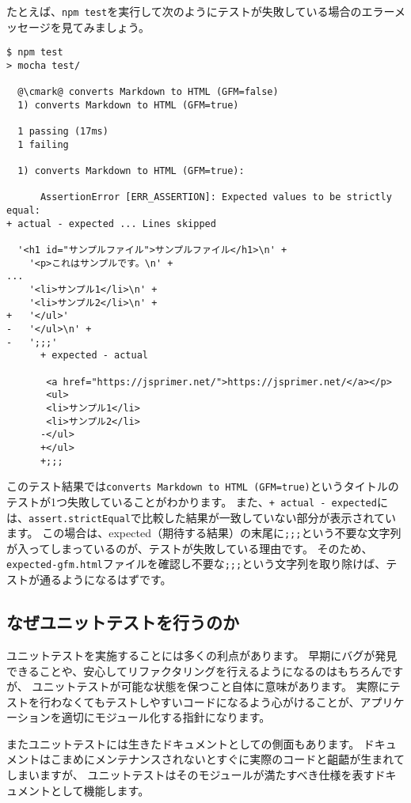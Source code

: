 たとえば、\texttt{npm test}を実行して次のようにテストが失敗している場合のエラーメッセージを見てみましょう。

\begin{lstlisting}[escapechar=@]
$ npm test
> mocha test/

  @\cmark@ converts Markdown to HTML (GFM=false)
  1) converts Markdown to HTML (GFM=true)

  1 passing (17ms)
  1 failing

  1) converts Markdown to HTML (GFM=true):

      AssertionError [ERR_ASSERTION]: Expected values to be strictly equal:
+ actual - expected ... Lines skipped

  '<h1 id="サンプルファイル">サンプルファイル</h1>\n' +
    '<p>これはサンプルです。\n' +
...
    '<li>サンプル1</li>\n' +
    '<li>サンプル2</li>\n' +
+   '</ul>'
-   '</ul>\n' +
-   ';;;'
      + expected - actual

       <a href="https://jsprimer.net/">https://jsprimer.net/</a></p>
       <ul>
       <li>サンプル1</li>
       <li>サンプル2</li>
      -</ul>
      +</ul>
      +;;;
\end{lstlisting}

このテスト結果では\texttt{converts Markdown to HTML (GFM=true)}というタイトルのテストが1つ失敗していることがわかります。
また、\texttt{+ actual - expected}には、\texttt{assert.strictEqual}で比較した結果が一致していない部分が表示されています。
この場合は、expected（期待する結果）の末尾に\texttt{;;;}という不要な文字列が入ってしまっているのが、テストが失敗している理由です。
そのため、\texttt{expected-gfm.html}ファイルを確認し不要な\texttt{;;;}という文字列を取り除けば、テストが通るようになるはずです。

\hypertarget{reason-for-unit-test}{%
\subsection{なぜユニットテストを行うのか}\label{reason-for-unit-test}}

ユニットテストを実施することには多くの利点があります。
早期にバグが発見できることや、安心してリファクタリングを行えるようになるのはもちろんですが、
ユニットテストが可能な状態を保つこと自体に意味があります。
実際にテストを行わなくてもテストしやすいコードになるよう心がけることが、アプリケーションを適切にモジュール化する指針になります。

またユニットテストには生きたドキュメントとしての側面もあります。
ドキュメントはこまめにメンテナンスされないとすぐに実際のコードと齟齬が生まれてしまいますが、
ユニットテストはそのモジュールが満たすべき仕様を表すドキュメントとして機能します。

